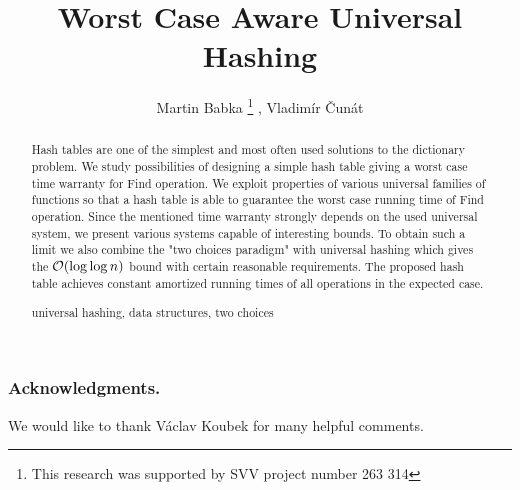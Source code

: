 \documentclass[runningheads,a4paper]{llncs}
\newcommand{\keywords}[1]{\par\addvspace\baselineskip
\noindent\keywordname\enspace\ignorespaces#1}
\begin{document}
\mainmatter

\author{Martin Babka%
\thanks{This research was supported by SVV project number 263 314}%
, Vladimír Čunát}

\title{Worst Case Aware Universal Hashing}



\maketitle

\begin{abstract}
Hash tables are one of the simplest and most often used solutions to the dictionary problem. 
We study possibilities of designing a simple hash table giving a worst case time warranty for Find operation.
We exploit properties of various universal families of functions so that a hash table is able to guarantee the worst case running time of Find operation.
Since the mentioned time warranty strongly depends on the used universal system, we present various systems capable of interesting bounds.
To obtain such a limit we also combine the "two choices paradigm" with universal hashing which gives the $\mathcal{O}(\log \log n)$ bound with certain reasonable requirements.
The proposed hash table achieves constant amortized running times of all operations in the expected case.

\keywords{universal hashing, data structures, two choices}
\end{abstract}






\subsubsection*{Acknowledgments.}
We would like to thank Václav Koubek for many helpful comments.



\clearpage
% 


\end{document}
